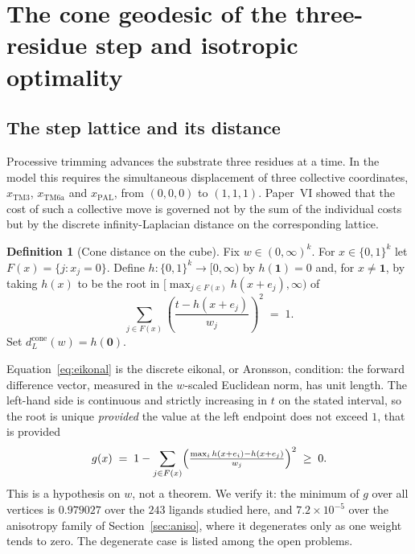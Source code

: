 \documentclass[11pt,reqno]{amsart}
\theoremstyle{plain}
\theoremstyle{definition}
\newtheorem{definition}[theorem]{Definition}
\theoremstyle{remark}
\numberwithin{equation}{section}
\newcommand{\dcone}{d_L^{\mathrm{cone}}}
\begin{document}
\section{The cone geodesic of the three-residue step and isotropic optimality}
\label{sec:cone}

\subsection{The step lattice and its distance}
Processive trimming advances the substrate three residues at a time. In the model this requires the simultaneous displacement of three collective coordinates, $x_{\mathrm{TM3}}$, $x_{\mathrm{TM6a}}$ and $x_{\mathrm{PAL}}$, from $(0,0,0)$ to $(1,1,1)$. Paper~VI showed that the cost of such a collective move is governed not by the sum of the individual costs but by the discrete infinity-Laplacian distance on the corresponding lattice.

\begin{definition}[Cone distance on the cube]
\label{def:cone}
Fix $w\in(0,\infty)^k$. For $x\in\{0,1\}^k$ let $F(x)=\{j:x_j=0\}$. Define $h:\{0,1\}^k\to[0,\infty)$ by $h(\mathbf{1})=0$ and, for $x\ne\mathbf{1}$, by taking $h(x)$ to be the root in $[\max_{j\in F(x)}h(x+e_j),\infty)$ of
\begin{equation}
\label{eq:eikonal}
\sum_{j\in F(x)}\left(\frac{t-h(x+e_j)}{w_j}\right)^{\!2}\;=\;1 .
\end{equation}
Set $\dcone(w)=h(\mathbf{0})$.
\end{definition}

Equation~\eqref{eq:eikonal} is the discrete eikonal, or Aronsson, condition: the forward difference vector, measured in the $w$-scaled Euclidean norm, has unit length. The left-hand side is continuous and strictly increasing in $t$ on the stated interval, so the root is unique \emph{provided} the value at the left endpoint does not exceed $1$, that is provided
\begin{equation}
\label{eq:slack}
g(x)\;=\;1-\sum_{j\in F(x)}\Bigl(\tfrac{\max_i h(x+e_i)-h(x+e_j)}{w_j}\Bigr)^{2}\;\ge\;0 .
\end{equation}
This is a hypothesis on $w$, not a theorem. We verify it: the minimum of $g$ over all vertices is $0.979027$ over the $243$ ligands studied here, and $7.2\times10^{-5}$ over the anisotropy family of Section~\ref{sec:aniso}, where it degenerates only as one weight tends to zero. The degenerate case is listed among the open problems.
\end{document}
